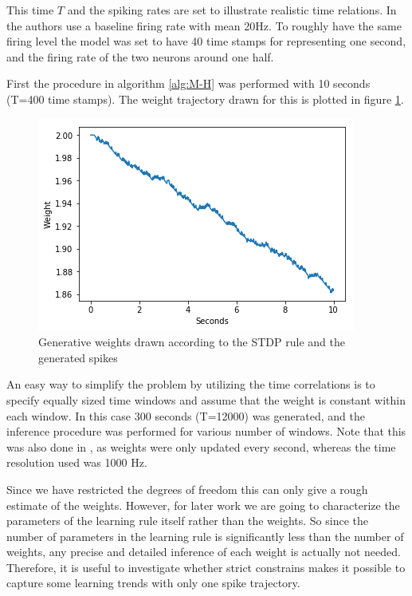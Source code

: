 This time $T$ and the spiking rates are set to illustrate realistic time relations. In \cite{Linderman} the authors use a baseline firing rate with mean 20Hz. To roughly have the same firing level the model was set to have 40 time stamps for representing one second, and the firing rate of the two neurons around one half. 

First the procedure in algorithm \ref{alg:M-H} was performed with 10 seconds (T=400 time stamps). The weight trajectory drawn for this is plotted in figure \ref{fig:w_STDP}. 


\begin{figure}[hbt!]
\caption{Generative weights drawn according to the STDP rule and the generated spikes}
\label{fig:w_STDP}
    \centering
    \includegraphics[scale=0.8]{fig/LR_underllying.png}
\end{figure}

An easy way to simplify the problem by utilizing the time correlations is to specify equally sized time windows and assume that the weight is constant within each window. In this case 300 seconds (T=12000) was generated, and the inference procedure was performed for various number of windows. Note that this was also done in \cite{Linderman}, as weights were only updated every second, whereas the time resolution used was 1000 Hz. 

Since we have restricted the degrees of freedom this can only give a rough estimate of the weights. However, for later work we are going to characterize the parameters of the learning rule itself rather than the weights. So since the number of parameters in the learning rule is significantly less than the number of weights, any precise and detailed inference of each weight is actually not needed. Therefore, it is useful to investigate whether strict constrains makes it possible to capture some learning trends with only one spike trajectory.



